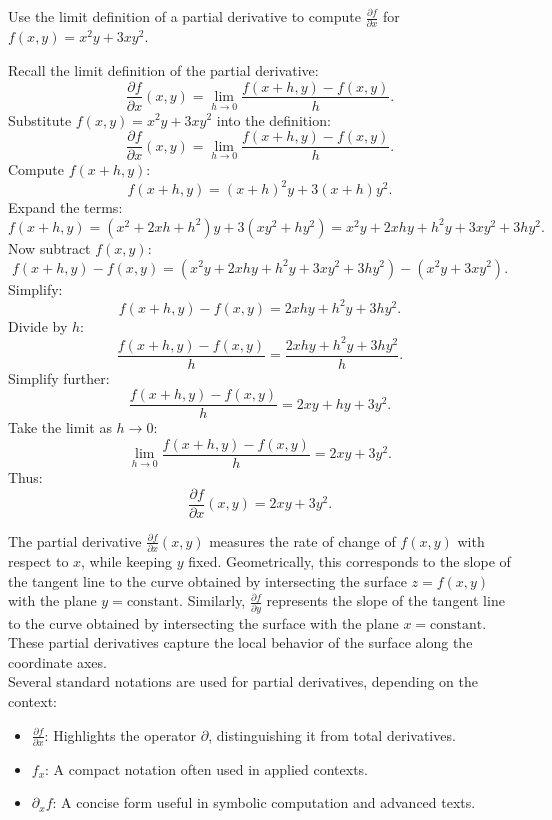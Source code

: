 \exampleline
\begin{example}
Use the limit definition of a partial derivative to compute \( \frac{\partial f}{\partial x} \) for \( f(x, y) = x^2y + 3xy^2 \).

\begin{solution}
\noindent Recall the limit definition of the partial derivative:
\[
\frac{\partial f}{\partial x}(x, y) = \lim_{h \to 0} \frac{f(x + h, y) - f(x, y)}{h}.
\]
Substitute \( f(x, y) = x^2y + 3xy^2 \) into the definition:
\[
\frac{\partial f}{\partial x}(x, y) = \lim_{h \to 0} \frac{f(x + h, y) - f(x, y)}{h}.
\]
Compute \( f(x + h, y) \):
\[
f(x + h, y) = (x + h)^2y + 3(x + h)y^2.
\]
Expand the terms:
\[
f(x + h, y) = (x^2 + 2xh + h^2)y + 3(xy^2 + hy^2) = x^2y + 2xhy + h^2y + 3xy^2 + 3hy^2.
\]
Now subtract \( f(x, y) \):
\[
f(x + h, y) - f(x, y) = (x^2y + 2xhy + h^2y + 3xy^2 + 3hy^2) - (x^2y + 3xy^2).
\]
Simplify:
\[
f(x + h, y) - f(x, y) = 2xhy + h^2y + 3hy^2.
\]
Divide by \( h \):
\[
\frac{f(x + h, y) - f(x, y)}{h} = \frac{2xhy + h^2y + 3hy^2}{h}.
\]
Simplify further:
\[
\frac{f(x + h, y) - f(x, y)}{h} = 2xy + hy + 3y^2.
\]
Take the limit as \( h \to 0 \):
\[
\lim_{h \to 0} \frac{f(x + h, y) - f(x, y)}{h} = 2xy + 3y^2.
\]
Thus:
\[
\frac{\partial f}{\partial x}(x, y) = 2xy + 3y^2.
\]
\end{solution}
\end{example}
\exampleline


\noindent The partial derivative \( \frac{\partial f}{\partial x}(x, y) \) measures the rate of change of \( f(x, y) \) with respect to \( x \), while keeping \( y \) fixed. Geometrically, this corresponds to the slope of the tangent line to the curve obtained by intersecting the surface \( z = f(x, y) \) with the plane \( y = \text{constant} \). Similarly, \( \frac{\partial f}{\partial y} \) represents the slope of the tangent line to the curve obtained by intersecting the surface with the plane \( x = \text{constant} \). These partial derivatives capture the local behavior of the surface along the coordinate axes. \\

\noindent Several standard notations are used for partial derivatives, depending on the context:
\begin{itemize}
    \item \( \frac{\partial f}{\partial x} \): Highlights the operator \( \partial \), distinguishing it from total derivatives.
    \item \( f_x \): A compact notation often used in applied contexts.
    \item \( \partial_x f \): A concise form useful in symbolic computation and advanced texts.
\end{itemize}

